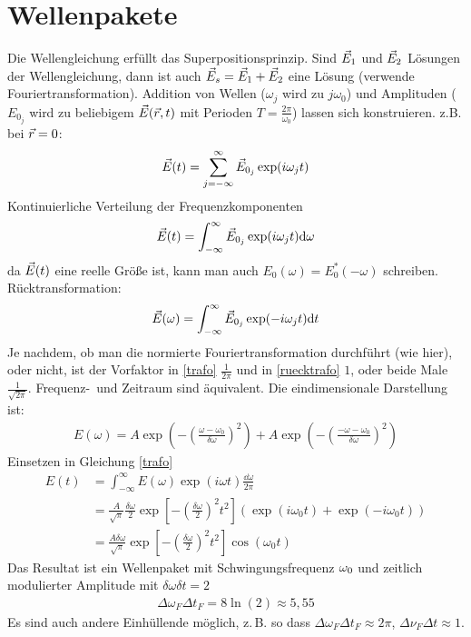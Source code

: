 \section{Wellenpakete}
Die Wellengleichung erfüllt das Superpositionsprinzip. Sind $\vec{E}_1$
und $\vec{E}_2$ Lösungen der Wellengleichung, dann ist auch
$\vec{E}_s=\vec{E}_1+\vec{E}_2$ eine Lösung (verwende
Fouriertransformation). 
Addition von Wellen ($\omega_j$ wird zu $j\omega_0$) und Amplituden
($E_{0_j}$ wird zu beliebigem $\vec{E}(\vec{r},t)$ mit Perioden $T=\frac{2\pi}{\omega_0}$) lassen sich konstruieren. z.B. bei $\vec{r}=0$:
\begin{gather*}
  \vec{E}(t)= \sum_{j=-\infty}^{\infty}
  \vec{E}_{0_j}\exp(i\omega_j t)
\end{gather*}
Kontinuierliche Verteilung der Frequenzkomponenten
\begin{gather}
  \vec{E}(t)= \int_{-\infty}^{\infty}\vec{E}_{0_j}\exp(i\omega_j t)\mathrm{d} \omega
  \label{trafo}
\end{gather}
da $\vec{E}(t)$ eine reelle Größe ist, kann man auch $E_0(\omega)=
E_0^*(-\omega)$ schreiben. Rücktransformation:
\begin{gather}
  \vec{E}(\omega) = \int_{-\infty}^{\infty}\vec{E}_{0_j}\exp(-i\omega_j
  t)\mathrm{d} t
  \label{ruecktrafo}
\end{gather}
Je nachdem, ob man die normierte Fouriertransformation durchführt (wie
hier), oder nicht, ist der Vorfaktor in \eqref{trafo} $\frac{1}{2\pi}$ und
in \eqref{ruecktrafo} $1$, oder beide Male $\frac{1}{\sqrt{2\pi}}$.
Frequenz-~und Zeitraum sind äquivalent. Die eindimensionale
Darstellung ist:
\begin{align}
  E(\omega) = A\exp\left(-\left(
  \frac{\omega-\omega_0}{\delta \omega}
  \right)^2\right)
  + A \exp\left(-\left(
  \frac{-\omega-\omega_0}{\delta \omega}
  \right)^2\right)
\end{align}
Einsetzen in Gleichung \eqref{trafo}
\begin{align*}
  E(t)&= \int_{-\infty}^{\infty} 
        E(\omega)\exp(i\omega t) \frac{\dd\omega}{2\pi}\\
      &= \frac{A}{\sqrt{\pi}}\frac{\delta\omega}{2}\exp\left[
        -\left( \frac{\delta\omega}{2} \right)^2 t^2
        \right]
        \left( \exp(i\omega_0 t) + \exp(-i\omega_0 t) \right)\\
      &=\frac{A\delta\omega}{\sqrt{\pi}}
        \exp\left[
        -\left(\frac{\delta\omega}{2}\right)^2 t^2
        \right]
        \cos(\omega_0t)
\end{align*}
Das Resultat ist ein Wellenpaket mit Schwingungsfrequenz $\omega_0$ und
zeitlich modulierter Amplitude mit $\delta\omega\delta t=2$ 
\begin{align*}
  \Delta\omega_F\Delta t_F=8\ln(2)\approx5,55
\end{align*}
Es sind auch andere Einhüllende möglich, z.\,B. so dass $\Delta\omega_F\Delta
t_F\approx2\pi$, $\Delta\nu_F\Delta t\approx 1$.

